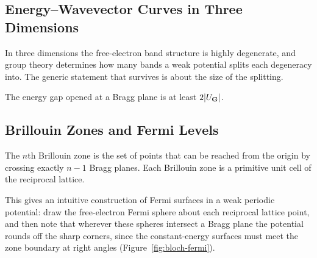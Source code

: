 \subsection{Energy--Wavevector Curves in Three Dimensions}

In three dimensions the free-electron band structure is highly degenerate, and group theory determines how many bands a weak potential splits each degeneracy into. The generic statement that survives is about the size of the splitting.

\begin{fact}
\label{fact:bloch-gap}
The energy gap opened at a Bragg plane is at least $2|U_{\cvect{G}}|$.
\end{fact}

\subsection{Brillouin Zones and Fermi Levels}

\begin{definition}
The $n$th Brillouin zone is the set of points that can be reached from the origin by crossing exactly $n-1$ Bragg planes. Each Brillouin zone is a primitive unit cell of the reciprocal lattice.
\end{definition}

This gives an intuitive construction of Fermi surfaces in a weak periodic potential: draw the free-electron Fermi sphere about each reciprocal lattice point, and then note that wherever these spheres intersect a Bragg plane the potential rounds off the sharp corners, since the constant-energy surfaces must meet the zone boundary at right angles (Figure~\ref{fig:bloch-fermi}).

